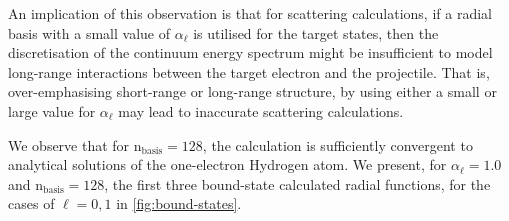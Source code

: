 \documentclass[]{article}
\begin{document}
An implication of this observation is that for scattering calculations, if a
radial basis with a small value of $\alpha_{\ell}$ is utilised for the target
states, then the discretisation of the continuum energy spectrum might be
insufficient to model long-range interactions between the target electron and
the projectile.
That is, over-emphasising short-range or long-range structure, by using either a
small or large value for $\alpha_{\ell}$ may lead to inaccurate scattering
calculations.


We observe that for $\mathrm{n_{basis}} = 128$, the calculation is sufficiently
convergent to analytical solutions of the one-electron Hydrogen atom.
We present, for $\alpha_{\ell} = 1.0$ and $\mathrm{n_{basis}} = 128$, the first
three bound-state calculated radial functions, for the cases of $\ell = 0, 1$ in
\autoref{fig:bound-states}.
\end{document}
